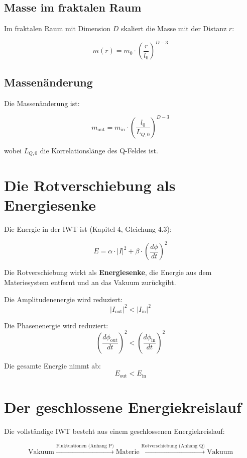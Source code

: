 \subsection{Masse im fraktalen Raum}

Im fraktalen Raum mit Dimension $D$ skaliert die Masse mit der Distanz $r$:

\[
m(r) = m_0 \cdot \left( \frac{r}{l_0} \right)^{D-3} \tag{Q.3}
\]

\subsection{Massenänderung}

Die Massenänderung ist:

\[
m_{\text{out}} = m_{\text{in}} \cdot \left( \frac{l_0}{L_{Q,0}} \right)^{D-3} \tag{Q.4}
\]

wobei $L_{Q,0}$ die Korrelationslänge des Q-Feldes ist.

\section{Die Rotverschiebung als Energiesenke}
\label{app:rotverschiebung_energiesenke}

Die Energie in der IWT ist (Kapitel 4, Gleichung 4.3):

\[
E = \alpha \cdot |I|^2 + \beta \cdot \left( \frac{d\phi}{dt} \right)^2 \tag{Q.5}
\]

Die Rotverschiebung wirkt als \textbf{Energiesenke}, die Energie aus dem Materiesystem entfernt und an das Vakuum zurückgibt.

Die Amplitudenenergie wird reduziert:
\[
|I_{\text{out}}|^2 < |I_{\text{in}}|^2 \tag{Q.6}
\]

Die Phasenenergie wird reduziert:
\[
\left( \frac{d\phi_{\text{out}}}{dt} \right)^2 < \left( \frac{d\phi_{\text{in}}}{dt} \right)^2 \tag{Q.7}
\]

Die gesamte Energie nimmt ab:
\[
E_{\text{out}} < E_{\text{in}} \tag{Q.8}
\]

\section{Der geschlossene Energiekreislauf}
\label{app:rotverschiebung_kreislauf}

Die vollständige IWT besteht aus einem geschlossenen Energiekreislauf:

\[
\boxed{
\text{Vakuum} \xrightarrow{\text{Fluktuationen (Anhang P)}} \text{Materie} \xrightarrow{\text{Rotverschiebung (Anhang Q)}} \text{Vakuum}
} \tag{Q.9}
\]


